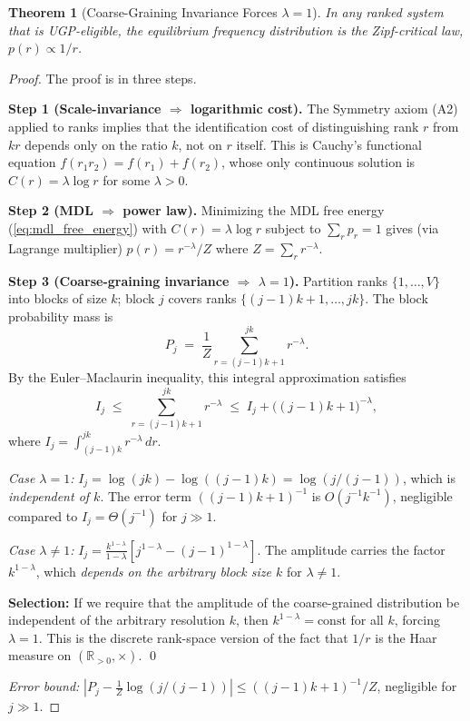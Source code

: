 \documentclass[11pt]{article}
\newtheorem{theorem}{Theorem}[section]
\begin{document}
\begin{theorem}[Coarse-Graining Invariance Forces $\lambda=1$]\label{thm:zipf}
In any ranked system that is UGP-eligible, the equilibrium frequency distribution is the Zipf-critical law, $p(r) \propto 1/r$.
\end{theorem}
\begin{proof}
The proof is in three steps.

\textbf{Step 1 (Scale-invariance $\Rightarrow$ logarithmic cost).} The Symmetry axiom (A2) applied to ranks implies that the identification cost of distinguishing rank $r$ from $kr$ depends only on the ratio $k$, not on $r$ itself. This is Cauchy's functional equation $f(r_1 r_2) = f(r_1)+f(r_2)$, whose only continuous solution is $C(r)=\lambda\log r$ for some $\lambda>0$.

\textbf{Step 2 (MDL $\Rightarrow$ power law).} Minimizing the MDL free energy (\cref{eq:mdl_free_energy}) with $C(r)=\lambda\log r$ subject to $\sum_r p_r=1$ gives (via Lagrange multiplier) $p(r) = r^{-\lambda}/Z$ where $Z=\sum_r r^{-\lambda}$.

\textbf{Step 3 (Coarse-graining invariance $\Rightarrow$ $\lambda=1$).} Partition ranks $\{1,\ldots,V\}$ into blocks of size $k$; block $j$ covers ranks $\{(j-1)k+1,\ldots,jk\}$. The block probability mass is
\[
P_j \;=\; \frac{1}{Z}\sum_{r=(j-1)k+1}^{jk} r^{-\lambda}.
\]
By the Euler--Maclaurin inequality, this integral approximation satisfies
\[
I_j \;\leq\; \sum_{r=(j-1)k+1}^{jk} r^{-\lambda} \;\leq\; I_j + \bigl((j-1)k+1\bigr)^{-\lambda},
\]
where $I_j = \int_{(j-1)k}^{jk} r^{-\lambda}\,dr$.

\textit{Case $\lambda=1$:} $I_j = \log(jk)-\log((j-1)k) = \log(j/(j-1))$, which is \emph{independent of $k$}. The error term $((j-1)k+1)^{-1}$ is $O(j^{-1}k^{-1})$, negligible compared to $I_j = \Theta(j^{-1})$ for $j\gg 1$.

\textit{Case $\lambda\neq 1$:} $I_j = \frac{k^{1-\lambda}}{1-\lambda}[j^{1-\lambda}-(j-1)^{1-\lambda}]$. The amplitude carries the factor $k^{1-\lambda}$, which \emph{depends on the arbitrary block size $k$} for $\lambda\neq 1$.

\textbf{Selection:} If we require that the amplitude of the coarse-grained distribution be independent of the arbitrary resolution $k$, then $k^{1-\lambda}=\text{const}$ for all $k$, forcing $\lambda=1$. This is the discrete rank-space version of the fact that $1/r$ is the Haar measure on $(\mathbb{R}_{>0},\times)$. \qed

\textit{Error bound:} $|P_j - \frac{1}{Z}\log(j/(j-1))| \leq ((j-1)k+1)^{-1}/Z$, negligible for $j\gg 1$.
\end{proof}
\end{document}
